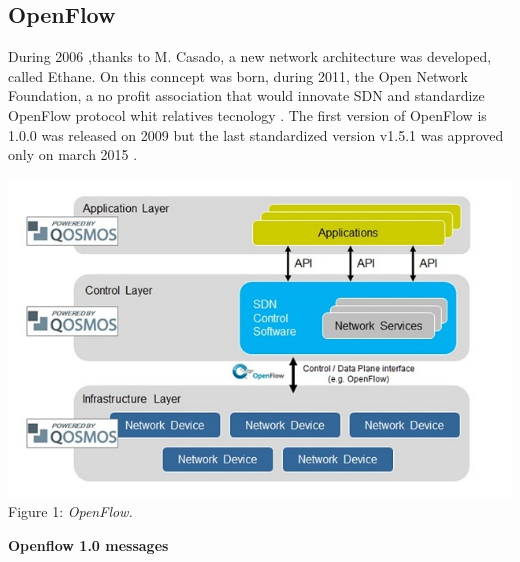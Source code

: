 \documentclass[article,10pt]{IEEEtran}
\begin{document}
\subsection{OpenFlow}
  During 2006 ,thanks to M. Casado, a new network architecture was developed, called Ethane.
  On this conncept was born, during 2011, the Open Network Foundation, a no profit association that would innovate SDN and standardize OpenFlow protocol whit relatives tecnology \cite{ONF}.
  The first version of OpenFlow is 1.0.0 was released on 2009 but the last standardized version v1.5.1 was approved only on march 2015 \cite{ONF_report}.
\begin{center}
 \centering
 \includegraphics[scale=0.58]{images/of.jpg}
 {Figure 1: \emph{OpenFlow.}}
\end{center}
\textbf{Openflow 1.0 messages}
  
\end{document}
